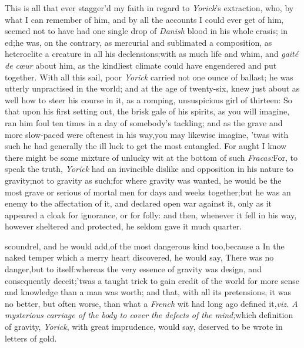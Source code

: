 \documentclass{article}
\begin{document}
This is all that ever stagger’d my faith in regard to
\textit{Yorick}’s extraction, who, by what I can remember of
him, and by all 
the accounts I could ever get of him,\break
seemed not to have had one single drop\break
of \textit{Danish} blood in his whole crasis; in\break
{}
ed;\tsk  he was, on the contrary, as mercurial and
sublimated a composition,\tsk\break
as heteroclite a creature in all
his declensions;\tsk  with as much life and whim, and
\textit{gaité de cœur} about him, as the kindliest
climate could have engendered and put together. With all this sail,
poor \textit{Yorick} carried not one ounce of ballast; he was utterly
unpractised in the world; and at the age of twenty-six, knew just
about as well how to steer his course in it, as a romping,
unsuspicious girl of thirteen: So that upon his first setting out,
the brisk gale of his spirits, as you will imagine, ran him foul
ten times in a day of somebody’s tackling; and as the grave
and more slow-paced were oftenest in his way,\tsh  you may
likewise imagine, ’twas with such he had generally the ill
luck to get the most entangled. For aught I know there might be
some mixture of unlucky wit at the bottom of such
\textit{Fracas:}\tsh  For, to speak the truth, \textit{Yorick}
had an invincible dislike and opposition in his nature to
gravity;\tsk  not to gravity as such;\tsk  for where gravity was
wanted, he would be the most grave or serious of mortal men for
days and weeks together;\tsk  but he was an enemy to the
affectation of it, and declared open war against it, only as it
appeared a cloak for ignorance, or for folly: and then, whenever it
fell in his way, however sheltered and protected, he seldom gave it
much quarter.

\noindent
{}
scoundrel, and he would add,\tsk  of the
most dangerous kind too,\tsk  because a\break
{} 
In the naked temper which a merry heart discovered, he would say, There was no
danger,\tsk  but to itself:\tsk  whereas the very essence of gravity was design, and
consequently deceit;\tsk  ’twas a taught trick to gain credit of the world for more
sense and knowledge than a man was worth; and that, with all its pretensions,\tsk
it was no better, but often worse, than what a \textit{French} wit had long ago
defined it,\tsk  \textit{viz. A mysterious carriage of the body to cover the defects
of the mind;}\tsk  which definition of gravity, \textit{Yorick}, with great
imprudence, would say, deserved to be wrote in letters of gold.
\end{document}

